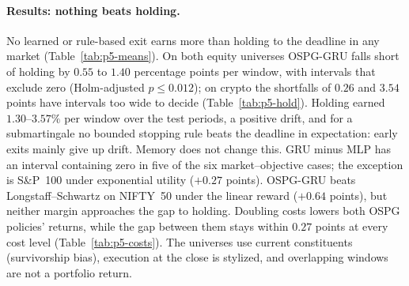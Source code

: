 \documentclass[11pt,a4paper]{article}
\begin{document}
\begin{table}[ht]
\centering\scriptsize
\caption{Mean economic net return per window (percent) at base cost. Hold and the two rules are
not trained, so they do not depend on the objective.}
\label{tab:p5-means}

\end{table}

\begin{table}[ht]
\centering\scriptsize
\caption{OSPG-GRU minus each comparator at base cost: economic net return per window in percentage
points, with 95\% date-block bootstrap interval; $^{*}$Holm-adjusted $p<0.05$.}
\label{tab:p5-hold}
\resizebox{\linewidth}{!}{}
\end{table}

\paragraph{Results: nothing beats holding.} No learned or rule-based exit earns more than
holding to the deadline in any market (Table~\ref{tab:p5-means}). On both equity universes
OSPG-GRU falls short of holding by $0.55$ to $1.40$ percentage points per window, with intervals
that exclude zero (Holm-adjusted $p\le0.012$); on crypto the shortfalls of $0.26$ and $3.54$
points have intervals too wide to decide (Table~\ref{tab:p5-hold}). Holding earned $1.30$--$3.57\%$
per window over the test periods, a positive drift, and for a submartingale no bounded stopping
rule beats the deadline in expectation: early exits mainly give up drift. Memory does not change
this. GRU minus MLP has an interval containing zero in five of the six market--objective cases;
the exception is S\&P~100 under exponential utility ($+0.27$ points). OSPG-GRU beats
Longstaff--Schwartz on NIFTY~50 under the linear reward ($+0.64$ points), but neither margin
approaches the gap to holding. Doubling costs lowers both OSPG policies' returns, while the gap
between them stays within $0.27$ points at every cost level (Table~\ref{tab:p5-costs}). The
universes use current
constituents (survivorship bias), execution at the close is stylized, and overlapping windows
are not a portfolio return.

\begin{table}[ht]
\centering\scriptsize
\caption{Cost sensitivity: mean economic net return per window (percent) of OSPG-GRU and
OSPG-MLP at zero, base and double costs; rewards are rebuilt and policies refitted at each level.}
\label{tab:p5-costs}

\end{table}
\end{document}
